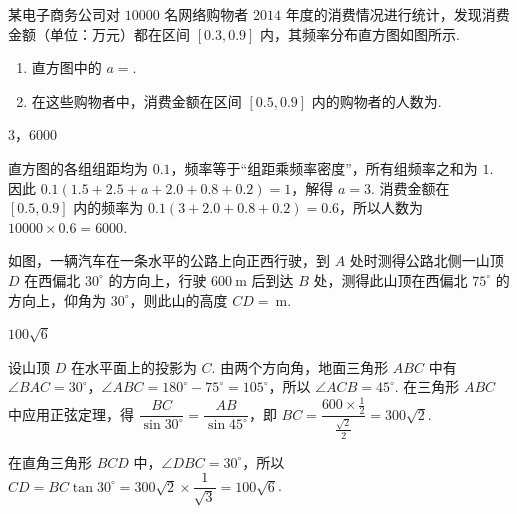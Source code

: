 \begin{problem}
某电子商务公司对 \(10000\) 名网络购物者 \(2014\) 年度的消费情况进行统计，发现消费金额（单位：万元）都在区间 \([0.3,0.9]\) 内，其频率分布直方图如图所示.

\begin{enumerate}
\item 直方图中的 \(a=\)\fillinblank{}.
\item 在这些购物者中，消费金额在区间 \([0.5,0.9]\) 内的购物者的人数为\fillinblank{}.
\end{enumerate}

\end{problem}

\begin{answer}
\(3\)，\(6000\)
\end{answer}

\begin{solution}
直方图的各组组距均为 \(0.1\)，频率等于“组距乘频率密度”，所有组频率之和为 \(1\). 因此 \(0.1(1.5+2.5+a+2.0+0.8+0.2)=1\)，解得 \(a=3\). 消费金额在 \([0.5,0.9]\) 内的频率为 \(0.1(3+2.0+0.8+0.2)=0.6\)，所以人数为 \(10000\times0.6=6000\).
\end{solution}

\begin{problem}
如图，一辆汽车在一条水平的公路上向正西行驶，到 \(A\) 处时测得公路北侧一山顶 \(D\) 在西偏北 \(30^\circ\) 的方向上，行驶 \(600\mathrm{~m}\) 后到达 \(B\) 处，测得此山顶在西偏北 \(75^\circ\) 的方向上，仰角为 \(30^\circ\)，则此山的高度 \(CD=\)\fillinblank{}\(\mathrm{~m}\).

\end{problem}

\begin{answer}
\(100\sqrt{6}\)
\end{answer}

\begin{solution}
设山顶 \(D\) 在水平面上的投影为 \(C\). 由两个方向角，地面三角形 \(ABC\) 中有 \(\angle BAC=30^\circ\)，\(\angle ABC=180^\circ-75^\circ=105^\circ\)，所以 \(\angle ACB=45^\circ\). 在三角形 \(ABC\) 中应用正弦定理，得 \(\dfrac{BC}{\sin30^\circ}=\dfrac{AB}{\sin45^\circ}\)，即 \(BC=\dfrac{600\times\frac12}{\frac{\sqrt2}{2}}=300\sqrt2\).

在直角三角形 \(BCD\) 中，\(\angle DBC=30^\circ\)，所以 \(CD=BC\tan30^\circ=300\sqrt2\times\dfrac1{\sqrt3}=100\sqrt6\).
\end{solution}

